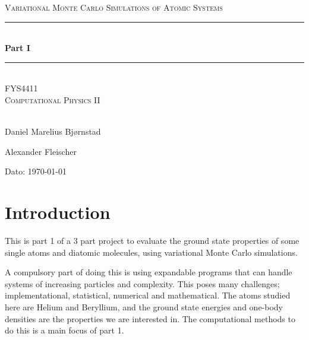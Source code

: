 \documentclass[twocolumn]{article}[10pt]
\title{}
\begin{document}
\begin{titlepage}
\begin{center}

\textsc{\Large Variational Monte Carlo Simulations of
Atomic Systems}\\[0.5cm]
\rule{\linewidth}{0.5mm} \\[0.4cm]
{ \huge \bfseries  Part I}\\[0.10cm]
\rule{\linewidth}{0.5mm} \\[1.5cm]
\textsc{\Large FYS4411}\\
\textsc{\Large Computational Physics II}\\[1.5cm]
\textsc{}\\[1.5cm]

\begin{minipage}{0.49\textwidth}
    \begin{center} \large
		Daniel Marelius Bj\o rnstad
    \end{center}
\end{minipage}
\begin{minipage}{0.49\textwidth}
    \begin{center} \large
        Alexander Fleischer
    \end{center}
\end{minipage}

\vfill

\large{Dato: \today}

\end{center}
\end{titlepage}

\maketitle

\section{Introduction}
This is part 1 of a 3 part project to evaluate the ground state properties of 
some single atoms and diatomic molecules, 
using variational Monte Carlo simulations. 

A compulsory part of doing this is using expandable programs that can handle 
systems of increasing particles and complexity. 
This poses many challenges; implementational, statistical, 
numerical and mathematical. 
The atoms studied here are Helium and Beryllium, 
and the ground state energies and one-body densities are the properties
we are interested in. The computational methods to do this is a main focus of 
part 1. 
\end{document}
